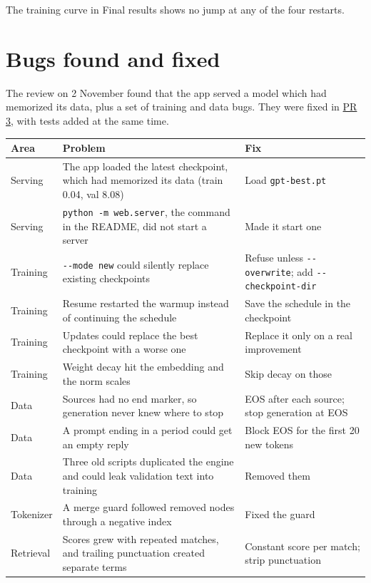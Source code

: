 \documentclass[11pt,a4paper]{article}
\newcommand{\code}[1]{\texttt{#1}}
\begin{document}
The training curve in Final results shows no jump at any of the four restarts.

\section*{Bugs found and fixed}
{}

The review on 2 November found that the app served a model which had memorized its data, plus a set of training and data bugs. They were fixed in \href{https://github.com/Jannatul-Naim/small-GPT-Model/pull/3}{PR 3}, with tests added at the same time.

{\small
\begin{longtable}{@{}>{\raggedright\arraybackslash\hspace{0pt}}p{}>{\raggedright\arraybackslash\hspace{0pt}}p{}>{\raggedright\arraybackslash\hspace{0pt}}p{}@{}}
\toprule
\textbf{Area} & \textbf{Problem} & \textbf{Fix} \\
\midrule
\endhead
Serving & The app loaded the latest checkpoint, which had memorized its data (train 0.04, val 8.08) & Load \code{gpt-\allowbreak{}best.\allowbreak{}pt} \\
Serving & \code{python -\allowbreak{}m web.\allowbreak{}server}, the command in the README, did not start a server & Made it start one \\
Training & \code{-\allowbreak{}-\allowbreak{}mode new} could silently replace existing checkpoints & Refuse unless \code{-\allowbreak{}-\allowbreak{}overwrite}; add \code{-\allowbreak{}-\allowbreak{}checkpoint-\allowbreak{}dir} \\
Training & Resume restarted the warmup instead of continuing the schedule & Save the schedule in the checkpoint \\
Training & Updates could replace the best checkpoint with a worse one & Replace it only on a real improvement \\
Training & Weight decay hit the embedding and the norm scales & Skip decay on those \\
Data & Sources had no end marker, so generation never knew where to stop & EOS after each source; stop generation at EOS \\
Data & A prompt ending in a period could get an empty reply & Block EOS for the first 20 new tokens \\
Data & Three old scripts duplicated the engine and could leak validation text into training & Removed them \\
Tokenizer & A merge guard followed removed nodes through a negative index & Fixed the guard \\
Retrieval & Scores grew with repeated matches, and trailing punctuation created separate terms & Constant score per match; strip punctuation \\
\bottomrule
\end{longtable}
}
\end{document}

